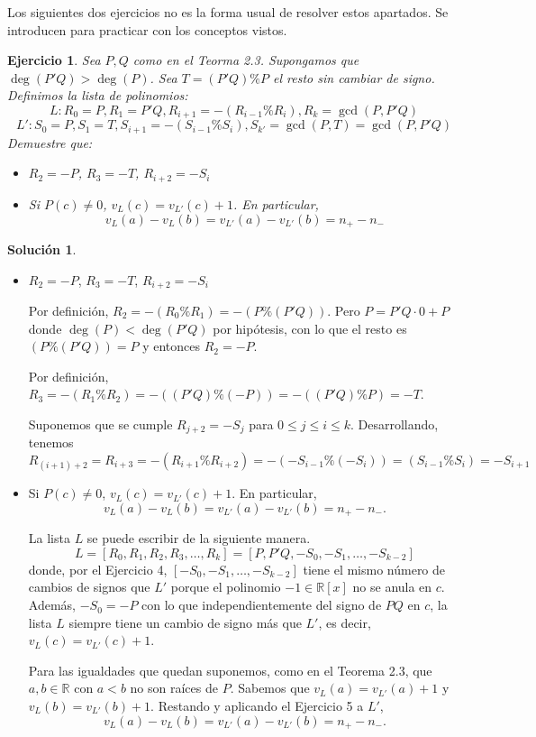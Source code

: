 \documentclass[10pt]{article}
\newtheorem{ejer}{Ejercicio}
\theoremstyle{definition}
\newtheorem*{sol}{Solución}
\newcommand{\RR}{\mathbb{R}}
\newcommand{\RRx}{\mathbb{R}[x]}
\begin{document}
Los siguientes dos ejercicios no es la forma usual de resolver estos apartados. Se introducen para practicar con los conceptos vistos.

\begin{ejer} Sea $P,Q$ como en el Teorma 2.3. Supongamos que $\deg(P'Q)>\deg(P)$. Sea $T=(P'Q)\%P$ el resto sin cambiar de signo. Definimos la lista de polinomios:
\[L: R_0=P,R_1=P'Q,R_{i+1}=-(R_{i-1}\%R_i), R_k=\gcd(P,P'Q)\]
\[L': S_0=P,S_1=T,S_{i+1}=-(S_{i-1}\%S_i),S_{k'}=\gcd(P,T)=\gcd(P,P'Q)\]
Demuestre que:
\begin{itemize}
    \item $R_2=-P$, $R_3=-T$, $R_{i+2}=-S_i$
    \item Si $P(c)\neq 0$, $v_L(c)=v_{L'}(c)+1$. En particular,
    \[v_L(a)-v_L(b)=v_{L'}(a)-v_{L'}(b)=n_+-n_-\]
\end{itemize}
\end{ejer}
\begin{sol}\leavevmode
\begin{itemize}
    \item $R_2=-P$, $R_3=-T$, $R_{i+2}=-S_i$
    
    Por definición, $R_2=-(R_0\% R_1)=-(P\% (P'Q))$. Pero $P=P'Q\cdot 0+P$ donde $\deg(P)<\deg(P'Q)$ por hipótesis, con lo que el resto es $(P\%(P'Q))=P$ y entonces $R_2=-P$.
    
    Por definición, $R_3 = -(R_1\% R_2)=-((P'Q)\% (-P))=-((P'Q)\%P)=-T$.
    
    Suponemos que se cumple $R_{j+2}=-S_j$ para $0\leq j\leq i\leq k$. Desarrollando, tenemos \[R_{(i+1)+2}=R_{i+3}=-(R_{i+1}\% R_{i+2})=-(-S_{i-1}\%(-S_i))=(S_{i-1}\% S_i)=-S_{i+1}\]
    
    \item Si $P(c)\neq 0$, $v_L(c)=v_{L'}(c)+1$. En particular,
    \[v_L(a)-v_L(b)=v_{L'}(a)-v_{L'}(b)=n_+-n_-.\]
    
    La lista $L$ se puede escribir de la siguiente manera. \[L=[R_0,R_1,R_2,R_3,\ldots, R_k ]=[P,P'Q,-S_0,-S_1,\ldots,-S_{k-2}]\]
    donde, por el Ejercicio 4, $[-S_0,-S_1,\ldots,-S_{k-2}]$ tiene el mismo número de cambios de signos que $L'$ porque el polinomio $-1\in\RRx$ no se anula en $c$. Además, $-S_0=-P$ con lo que independientemente del signo de $PQ$ en $c$, la lista $L$ siempre tiene un cambio de signo más que $L'$, es decir, $v_L(c)=v_{L'}(c)+1$.
    
    Para las igualdades que quedan suponemos, como en el Teorema 2.3, que $a,b\in\RR$ con $a<b$ no son raíces de $P$. Sabemos que $v_L(a)=v_{L'}(a)+1$ y $v_L(b)=v_{L'}(b)+1$. Restando y aplicando el Ejercicio 5 a $L'$, \[v_L(a)-v_L(b)=v_{L'}(a)-v_{L'}(b)=n_+-n_-.\]
\end{itemize}
\end{sol}
\end{document}
